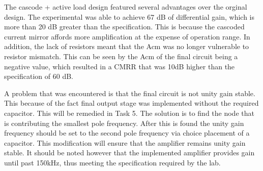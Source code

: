 The cascode + active load design featured several advantages over the orginal design. The experimental was able to achieve 67 dB of differential gain, which is more than 20 dB greater than the specification. This is because the cascoded current mirror affords more amplification at the expense of operation range. In addition, the lack of resistors meant that the Acm was no longer vulnerable to resistor mismatch. This can be seen by the Acm of the final circuit being a negative value, which resulted in a CMRR that was 10dB higher than the specification of 60 dB.

A problem that was encountered is that the final circuit is not unity gain stable. This because of the fact final output stage was implemented without the required capacitor. This will be remedied in Task 5. The solution is to find the node that is contributing the smallest pole frequency. After this is found the unity gain frequency should be set to the second pole frequency via choice placement of a capacitor. This modification will ensure that the amplifier remains unity gain stable. It should be noted however that the implemented amplifier provides gain until past 150kHz, thus meeting the specification required by the lab.
